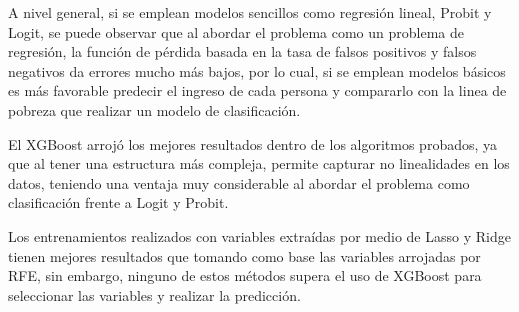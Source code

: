 \documentclass[11pt,a4paper]{article}
\begin{document}
A nivel general, si se emplean modelos sencillos como regresión lineal, Probit y Logit, se puede observar que al abordar el problema como un problema de regresión, la función de pérdida basada en la tasa de falsos positivos y falsos negativos da errores mucho más bajos, por lo cual, si se emplean modelos básicos es más favorable predecir el ingreso de cada persona y compararlo con la linea de pobreza que realizar un modelo de clasificación.

El XGBoost arrojó los mejores resultados dentro de los algoritmos probados, ya que al tener una estructura más compleja, permite capturar no linealidades en los datos, teniendo una ventaja muy considerable al abordar el problema como clasificación frente a Logit y Probit.

Los entrenamientos realizados con variables extraídas por medio de Lasso y Ridge tienen mejores resultados que tomando como base las variables arrojadas por RFE, sin embargo, ninguno de estos métodos supera el uso de XGBoost para seleccionar las variables y realizar la predicción.




\end{document}
